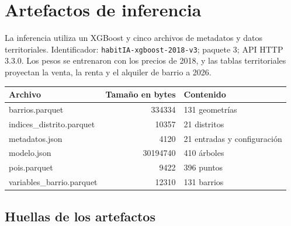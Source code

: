 \documentclass[11pt,a4paper]{article}
\renewcommand{\arraystretch}{1.25}
\newcommand{\thead}[1]{\textbf{#1}}
\newcounter{anexo}
\newcounter{anexosub}[anexo]
\begin{document}
\small
\setlength{\parskip}{0.5em}
\renewcommand{\arraystretch}{1.15}

\clearpage{}\label{anx:\theanexo}%
\section*{\theanexo\hspace{0.6em}Artefactos de inferencia}

La inferencia utiliza un XGBoost y cinco archivos de metadatos y datos territoriales. Identificador: \texttt{habitIA-xgboost-2018-v3}; paquete 3; API HTTP 3.3.0. Los pesos se entrenaron con los precios de 2018, y las tablas territoriales proyectan la venta, la renta y el alquiler de barrio a 2026.

\begin{center}
\begin{tabularx}{\linewidth}{@{}l r L@{}}
\toprule
\thead{Archivo} & \thead{Tamaño en bytes} & \thead{Contenido} \\
\midrule
barrios.parquet & 334334 & 131 geometrías \\
indices\_distrito.parquet & 10357 & 21 distritos \\
metadatos.json & 4120 & 21 entradas y configuración \\
modelo.json & 30194740 & 410 árboles \\
pois.parquet & 9422 & 396 puntos \\
variables\_barrio.parquet & 12310 & 131 barrios \\
\bottomrule
\end{tabularx}
\end{center}

%
\subsection*{\theanexo\hspace{0.3em}\hspace{0.45em}Huellas de los artefactos}
\end{document}
